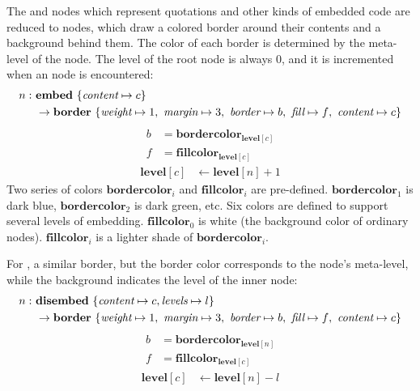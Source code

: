 \vspace{12pt}
The  and  nodes which represent quotations and other kinds of embedded code are reduced to  nodes, which draw a colored border around their contents and a background behind them. The color of each border is determined by the meta-level of the node. The level of the root node is always 0, and it is incremented when an  node is encountered:
\begin{align*}
n:~& {\mathbf{embed}~\{  {\textit{content} \mapsto c}  \}}
\\
	& \to 
	{\mathbf{border}~\{  {\textit{weight} \mapsto 1} ,~
					 {\textit{margin} \mapsto 3} ,~ 
					 {\textit{border} \mapsto b} ,~ 
					 {\textit{fill} \mapsto f} ,~ 
					 {\textit{content} \mapsto c}   \}}
\end{align*}
\begin{align*}
b &= \mathbf{bordercolor}_{\mathbf{level}[c]}
\\
f &= \mathbf{fillcolor}_{\mathbf{level}[c]}
\end{align*}
\begin{align*}
\mathbf{level}[c] & \leftarrow \mathbf{level}[n] + 1
\end{align*}
Two series of colors $\mathbf{bordercolor}_i$ and $\mathbf{fillcolor}_i$ are pre-defined. $\mathbf{bordercolor}_1$ is dark blue, $\mathbf{bordercolor}_2$ is dark green, etc. Six colors are defined to support several levels of embedding. $\mathbf{fillcolor}_0$ is white (the background color of ordinary nodes). $\mathbf{fillcolor}_i$ is a lighter shade of $\mathbf{bordercolor}_i$.

For , a similar border, but the border color corresponds to the  node's meta-level, while the background indicates the level of the inner node:
\begin{align*}
n:~& {\mathbf{disembed}~\{  {\textit{content} \mapsto c}, {\textit{levels} \mapsto l}  \}}
\\
	& \to 
	{\mathbf{border}~\{  {\textit{weight} \mapsto 1} ,~
					 {\textit{margin} \mapsto 3} ,~ 
					 {\textit{border} \mapsto b} ,~ 
					 {\textit{fill} \mapsto f} ,~ 
					 {\textit{content} \mapsto c}   \}}
\end{align*}
\begin{align*}
b &= \mathbf{bordercolor}_{\mathbf{level}[n]}
\\
f &= \mathbf{fillcolor}_{\mathbf{level}[c]}
\end{align*}
\begin{align*}
\mathbf{level}[c] & \leftarrow \mathbf{level}[n] - l
\end{align*}

